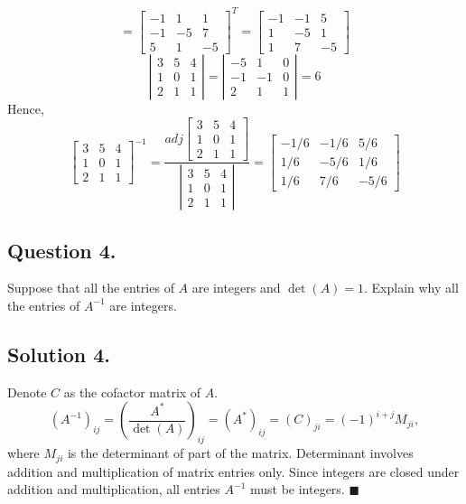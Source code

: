 \documentclass{article}
\begin{document}
\[=\left[\begin{array}{rrr}
-1 & 1 & 1 \\ -1 & -5 & 7 \\ 5 & 1 & -5\end{array}\right]^T=\left[\begin{array}{rrr}
-1 & -1 & 5 \\ 1 & -5 & 1 \\ 1 & 7 & -5\end{array}\right]\]
\[\left\vert\begin{array}{rrr}
3 & 5 & 4 \\1 & 0 & 1\\2 & 1 & 1\end{array}\right\vert=\left\vert\begin{array}{rrr}
-5 & 1 & 0 \\-1 & -1 & 0\\2 & 1 & 1\end{array}\right\vert=6\]
Hence, 
\[\left[\begin{array}{rrr}
3 & 5 & 4 \\1 & 0 & 1\\2 & 1 & 1\end{array}\right]^{-1}=\frac{adj \left[\begin{array}{rrr}
3 & 5 & 4 \\1 & 0 & 1\\2 & 1 & 1\end{array}\right]}{\left\vert\begin{array}{rrr}
3 & 5 & 4 \\1 & 0 & 1\\2 & 1 & 1\end{array}\right\vert}=\left[\begin{array}{rrr}
-1/6 & -1/6 & 5/6\\
1/6& -5/6 &1/6 \\1/6 & 7/6 & -5/6
\end{array}\right]\]
\subsection*{Question 4.}
Suppose that all the entries of $A$ are integers and $\det(A)=1$. Explain why all the entries of $A^{-1}$ are integers.
\subsection*{Solution 4.}
Denote $C$ as the cofactor matrix of $A$.
\[(A^{-1})_{ij}=\left(\frac{A^*}{\det(A)}\right)_{ij}=(A^*)_{ij}=(C)_{ji}=(-1)^{i+j}M_{ji},\]
where $M_{ji}$ is the determinant of part of the matrix. Determinant involves addition and multiplication of matrix entries only. Since integers are closed under addition and multiplication, all entries $A^{-1}$ must be integers. $\blacksquare$
\end{document}
